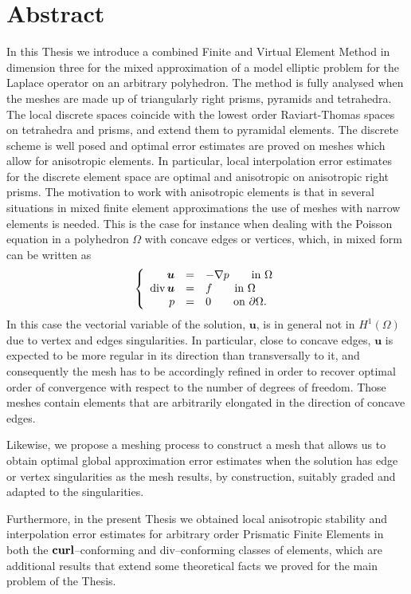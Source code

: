 \documentclass[12pt,a4paper,openany,oneside]{book}
\begin{document}
\section*{Abstract}
In this Thesis we introduce a combined Finite and Virtual Element Method in dimension three
for the mixed approximation of a 
model elliptic problem for the Laplace operator on an 
arbitrary polyhedron. 
The 
method is fully analysed when the meshes are made up of triangularly
right prisms, pyramids and tetrahedra. The local discrete 
spaces coincide with the lowest order Raviart-Thomas 
spaces on tetrahedra and prisms, and 
extend them to pyramidal elements. The discrete scheme 
is well posed and optimal error estimates are proved on meshes which 
allow for anisotropic elements. In particular, local 
interpolation error estimates for the discrete element space are 
optimal and anisotropic on anisotropic right prisms.
The motivation to work with anisotropic elements is that 
in several situations in mixed finite element approximations the use of meshes 
with narrow elements is needed. 
This is the case for instance when dealing with the Poisson equation 
in a polyhedron $\Omega$ with concave edges or vertices, which, in mixed form
can be written as
\begin{equation*}\label{mf} \left\{\begin{array}{rcl}
\boldsymbol{u}&=&-\nabla p\qquad \mbox{in }\Omega\\
\mbox{div\,}\boldsymbol{u}&=&f\qquad \mbox{in }\Omega\\
p&=&0\qquad\mbox{on }\partial\Omega.\end{array}\right.
\end{equation*}
In this case the vectorial variable of the solution, $\boldsymbol{u}$, is in 
general not in $H^1(\Omega)$ due to vertex and edges 
singularities. In particular, close to concave edges, 
$\boldsymbol{u}$ is expected to be more regular in its direction than transversally 
to it, and consequently the mesh has to be accordingly refined in order to 
recover optimal order of convergence with respect to the number of degrees of 
freedom. Those meshes contain elements that are arbitrarily elongated
in the direction of concave edges.

Likewise, we propose a meshing process to construct a mesh that
allows us to  obtain optimal global 
approximation error estimates when the 
solution has edge or vertex singularities as the mesh results, by construction,
suitably graded and adapted to the singularities.

Furthermore, in the present Thesis we obtained
local anisotropic stability
and interpolation error estimates for arbitrary order Prismatic
Finite Elements in both
the $\textbf{curl}$--conforming and div--conforming classes of elements, which are 
additional results that extend some theoretical facts we proved for
the main problem of the Thesis.
\end{document}
